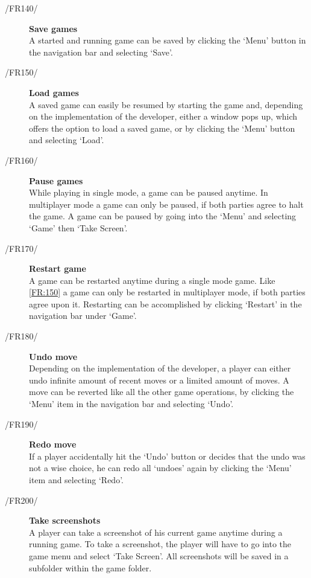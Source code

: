 \begin{description}
  	\item[/FR140/\label{FR:140}] {\bf Save games}  \hfill \\
  	A started and running game can be saved by clicking the `Menu' button in the navigation bar and selecting `Save'.
 	\item[/FR150/\label{FR:150}] {\bf Load games}  \\
 	A saved game can easily be resumed by starting the game and, depending on the implementation of the developer, either a window pops up, which offers the option to load a saved game, or by clicking the `Menu' button and selecting `Load'.
	\item[/FR160/\label{FR:160}] {\bf Pause games}  \\
	While playing in single mode, a game can be paused anytime. In multiplayer mode a game can only be paused, if both parties agree to halt the game. A game can be paused by going into the `Menu' and selecting `Game' then `Take Screen'.
	\item[/FR170/\label{FR:170}] {\bf Restart game}  \\
	A game can be restarted anytime during a single mode game. Like \ref{FR:150} a game can only be restarted in multiplayer mode, if both parties agree upon it. Restarting can be accomplished by clicking `Restart' in the navigation bar under `Game'.
	\item[/FR180/\label{FR:180}] {\bf Undo move}  \\
	Depending on the implementation of the developer, a player can either undo infinite amount of recent moves or a limited amount of moves. A move can be reverted like all the other game operations, by clicking the `Menu' item in the navigation bar and selecting `Undo'.
	\item[/FR190/\label{FR:190}] {\bf Redo move} \\
	If a player accidentally hit the `Undo' button or decides that the undo was not a wise choice, he can redo all `undoes' again by clicking the `Menu' item and selecting `Redo'.
	\item[/FR200/\label{FR:200}] {\bf Take screenshots} \\
	A player can take a screenshot of his current game anytime during a running game. To take a screenshot, the player will have to go into the game menu and select `Take Screen'. All screenshots will be saved in a subfolder within the game folder.
\end{description}

